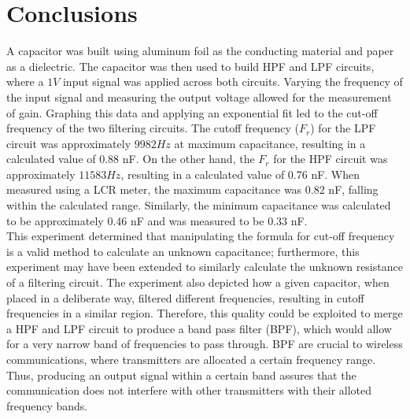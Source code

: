 \documentclass[journal]{IEEEtran}
\begin{document}
\section{Conclusions}

\noindent A capacitor was built using aluminum foil as the conducting material and paper as a dielectric. The capacitor was then used to build HPF and LPF circuits, where a $1V$ input signal was applied across both circuits. Varying the frequency of the input signal and measuring the output voltage allowed for the measurement of gain. Graphing this data and applying an exponential fit led to the cut-off frequency of the two filtering circuits. The cutoff frequency ($F_{r}$) for the LPF circuit was approximately $9982 Hz$ at maximum capacitance, resulting in a calculated value of 0.88 nF. On the other hand, the $F_{r}$ for the HPF circuit was approximately $11583 Hz$, resulting in a calculated value of 0.76 nF. When measured using a LCR meter, the maximum capacitance was 0.82 nF, falling within the calculated range. Similarly, the minimum capacitance was calculated to be approximately 0.46 nF and was measured to be 0.33 nF.\\

\noindent This experiment determined that manipulating the formula for cut-off frequency is a valid method to calculate an unknown capacitance; furthermore, this experiment may have been extended to similarly calculate the unknown resistance of a filtering circuit. The experiment also depicted how a given capacitor, when placed in a deliberate way, filtered different frequencies, resulting in cutoff frequencies in a similar region. Therefore, this quality could be exploited to merge a HPF and LPF circuit to produce a band pass filter (BPF), which would allow for a very narrow band of frequencies to pass through. BPF are crucial to wireless communications, where transmitters are allocated a certain frequency range. Thus, producing an output signal within a certain band assures that the communication does not interfere with other transmitters with their alloted frequency bands.






\printbibliography
\end{document}
